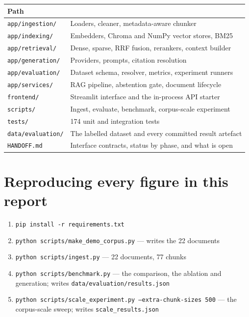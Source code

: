 \documentclass[11pt,a4paper]{article}
\newcommand{\code}[1]{\texttt{\small #1}}
\begin{document}
\begin{center}
\small
\begin{tabular}{@{}lp{10.2cm}@{}}
\toprule
\textbf{Path} & \\
\midrule
\code{app/ingestion/}  & Loaders, cleaner, metadata-aware chunker \\
\code{app/indexing/}   & Embedders, Chroma and NumPy vector stores, BM25 \\
\code{app/retrieval/}  & Dense, sparse, RRF fusion, rerankers, context builder \\
\code{app/generation/} & Providers, prompts, citation resolution \\
\code{app/evaluation/} & Dataset schema, resolver, metrics, experiment runners \\
\code{app/services/}   & RAG pipeline, abstention gate, document lifecycle \\
\code{frontend/}       & Streamlit interface and the in-process API starter \\
\code{scripts/}        & Ingest, evaluate, benchmark, corpus-scale experiment \\
\code{tests/}          & 174 unit and integration tests \\
\code{data/evaluation/}& The labelled dataset and every committed result artefact \\
\code{HANDOFF.md}      & Interface contracts, status by phase, and what is open \\
\bottomrule
\end{tabular}
\end{center}

\section{Reproducing every figure in this report}

\begin{enumerate}[leftmargin=1.4em,itemsep=2pt]
  \item \code{pip install -r requirements.txt}
  \item \code{python scripts/make\_demo\_corpus.py} --- writes the 22 documents
  \item \code{python scripts/ingest.py} --- 22 documents, 77 chunks
  \item \code{python scripts/benchmark.py} --- the comparison, the ablation and
        generation; writes \code{data/evaluation/results.json}
  \item \code{python scripts/scale\_experiment.py --extra-chunk-sizes 500} ---
        the corpus-scale sweep; writes \code{scale\_results.json}
\end{enumerate}
\end{document}
